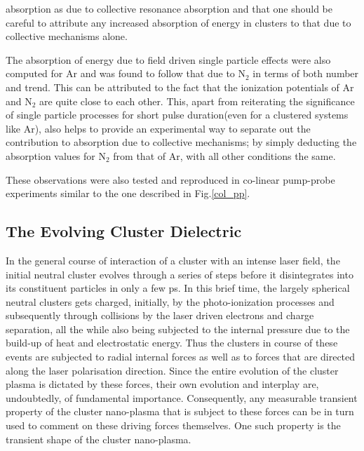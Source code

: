 \documentclass[a4paper,12pt]{article}
\begin{document}
absorption as due to collective resonance absorption and that one should be careful to attribute any increased absorption of energy in clusters to that due to collective mechanisms alone.

The absorption of energy due to field driven single particle effects were also computed for Ar and was found to follow that due to N$_{2}$ in terms of both number and trend. This can be attributed to the fact that the ionization potentials of Ar and N$_{2}$ are quite close to each other. This, apart from reiterating the significance of single particle processes for short pulse duration(even for a clustered systems like Ar), also helps to provide an experimental way to separate out the contribution to absorption due to collective mechanisms; by simply deducting the absorption values for N$_{2}$ from that of Ar, with all other conditions the same.

These observations were also tested and reproduced in co-linear pump-probe experiments similar to the one described in Fig.\ref{col_pp}.

\subsection{The Evolving Cluster Dielectric}
In the general course of interaction of a cluster with an intense laser field, the initial neutral cluster evolves through a series of steps before it disintegrates into its constituent particles in only a few ps. In this brief time, the largely spherical\cite{shapebogan, xrayscatter, jcphillip86} neutral clusters gets charged, initially, by the photo-ionization processes and subsequently through collisions by the laser driven electrons and charge separation, all the while also being subjected to the internal pressure due to the build-up of heat and electrostatic energy. Thus the clusters in course of these events are subjected to radial internal forces as well as to forces that are directed along the laser polarisation direction\cite{shapeeffectbarrington}. Since the entire evolution of the cluster plasma is dictated by these forces, their own evolution and interplay are, undoubtedly, of fundamental importance. Consequently, any measurable transient property of the cluster nano-plasma that is subject to these forces can be in turn used to comment on these driving forces themselves. One such property is the transient shape of the cluster nano-plasma.
\end{document}
